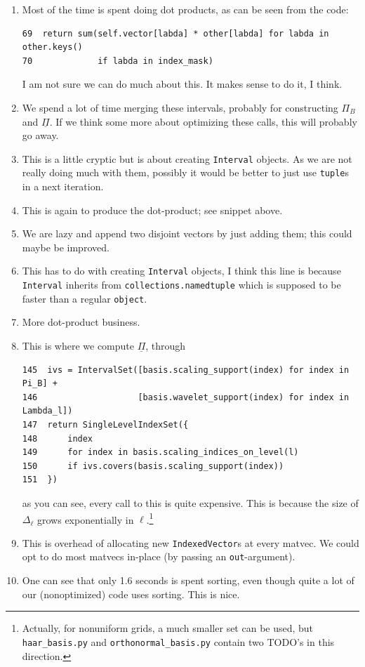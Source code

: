 \documentclass[11pt,a4paper]{amsart}
\theoremstyle{definition}
\begin{document}
\begin{enumerate}
  \item Most of the time is spent doing dot products, as can be seen from the code:
    \begin{verbatim}
69  return sum(self.vector[labda] * other[labda] for labda in other.keys()
70             if labda in index_mask)\end{verbatim}
    I am not sure we can do much about this. It makes sense to do it, I think.
  \item We spend a lot of time merging these intervals, probably for constructing
    $\Pi_B$ and $\underline \Pi$. If we think some more about optimizing these
    calls, this will probably go away.
  \item This is a little cryptic but is about creating \texttt{Interval} objects.
    As we are not really doing much with them, possibly it would be better to
    just use \texttt{tuple}s in a next iteration.
  \item This is again to produce the dot-product; see snippet above.
  \item We are lazy and append two disjoint vectors by just adding them; this
    could maybe be improved.
  \item This has to do with creating \texttt{Interval} objects, I think this line
    is because \texttt{Interval} inherits from \texttt{collections.namedtuple}
    which is supposed to be faster than a regular \texttt{object}.
  \item More dot-product business.
  \item This is where we compute $\underline \Pi$, through
    \begin{verbatim}
145  ivs = IntervalSet([basis.scaling_support(index) for index in Pi_B] +
146                    [basis.wavelet_support(index) for index in Lambda_l])
147  return SingleLevelIndexSet({
148      index
149      for index in basis.scaling_indices_on_level(l)
150      if ivs.covers(basis.scaling_support(index))
151  })\end{verbatim}
    as you can see, every call to this is quite expensive. This is because the
    size of $\Delta_\ell$ grows exponentially in $\ell$.\footnote{Actually, for
    nonuniform grids, a much smaller set can be used, but \texttt{haar\_basis.py}
    and \texttt{orthonormal\_basis.py} contain two TODO's in this direction.}
  \item This is overhead of allocating new \texttt{IndexedVector}s at every
    matvec. We could opt to do most matvecs in-place (by passing an
    \texttt{out}-argument).
  \item One can see that only 1.6 seconds is spent sorting, even though quite a
    lot of our (nonoptimized) code uses sorting. This is nice.
\end{enumerate}
\end{document}
